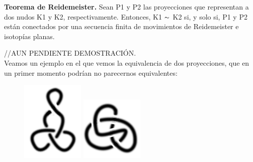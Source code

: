\documentclass[14pt]{extarticle}
\begin{document}
\begin{teo} \textbf{Teorema de Reidemeister.} Sean P1 y P2 las proyecciones que representan a dos nudos K1 y K2, respectivamente. Entonces, K1 $\thicksim$ K2 si, y solo si, P1 y P2 están conectados por una secuencia finita de movimientos de Reidemeister e isotopías planas.
\end{teo}
//AUN PENDIENTE DEMOSTRACIÓN.\\

Veamos un ejemplo en el que vemos la equivalencia de dos proyecciones, que en un primer momento podrían no parecernos equivalentes:
  \begin{figure}[h!]
  	\includegraphics[width=3cm]{inudos/3fseg.png}
  	\includegraphics[width=3cm]{inudos/fase3.png}

\end{figure}
\end{document}
